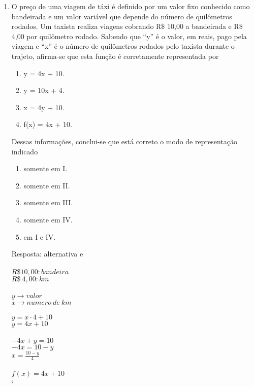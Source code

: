 \documentclass[a4paper,14pt]{article}
\begin{document}
\begin{enumerate}
        \item O preço de uma viagem de táxi é definido por um valor fixo conhecido como bandeirada e um valor
        variável que depende do número de quilômetros rodados. Um taxista realiza viagens cobrando
        R\$ 10,00 a bandeirada e R\$ 4,00 por quilômetro rodado.
        Sabendo que “y” é o valor, em reais, pago pela viagem e “x” é o número de quilômetros rodados pelo
        taxista durante o trajeto, afirma-se que esta função é corretamente representada por
        
        \begin{enumerate}[label=\Roman*.]
        	\item y = 4x + 10.
        	\item y = 10x + 4.
        	\item x = 4y + 10.
        	\item f(x) = 4x + 10.
        \end{enumerate}
        
        Dessas informações, conclui-se que está correto o modo de representação indicado
        
        \begin{enumerate}
        	\item somente em I.
        	\item somente em II. 
        	\item somente em III.
        	\item somente em IV.
        	\item em I e IV.
        \end{enumerate}
        Resposta: alternativa e \\ \\
        $R\$ 10,00 : bandeira$ \\
        $R\$ ~4,00 : km$ \\ \\
        $y \rightarrow valor$ \\
        $x \rightarrow numero~de~km$ \\ \\
        $y = x \cdot 4 + 10$ \\
        $y = 4x + 10$ \\ \\
        $-4x + y = 10$ \\
        $-4x = 10 - y$ \\
        $x = \frac{10-y}{4}$ \\ \\
        $f(x) = 4x + 10$ \\`
        

\end{enumerate}
\end{document}
